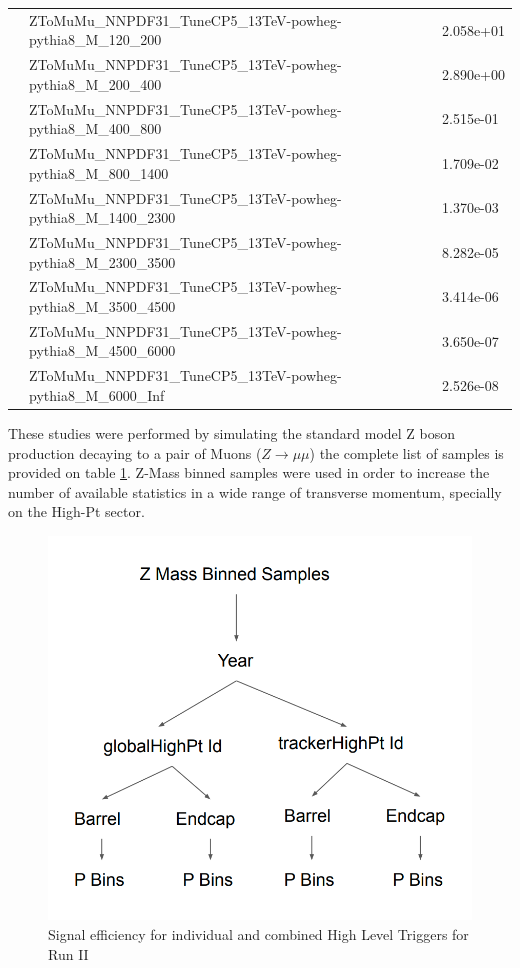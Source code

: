 \begin{table}
\begin{center}
\begin{tabular}{|l|l|l|}
&ZToMuMu\_NNPDF31\_TuneCP5\_13TeV-powheg-pythia8\_M\_120\_200 & 2.058e+01\\
&ZToMuMu\_NNPDF31\_TuneCP5\_13TeV-powheg-pythia8\_M\_200\_400 & 2.890e+00\\
&ZToMuMu\_NNPDF31\_TuneCP5\_13TeV-powheg-pythia8\_M\_400\_800 & 2.515e-01\\
&ZToMuMu\_NNPDF31\_TuneCP5\_13TeV-powheg-pythia8\_M\_800\_1400 & 1.709e-02\\
&ZToMuMu\_NNPDF31\_TuneCP5\_13TeV-powheg-pythia8\_M\_1400\_2300 & 1.370e-03\\
&ZToMuMu\_NNPDF31\_TuneCP5\_13TeV-powheg-pythia8\_M\_2300\_3500 & 8.282e-05\\
&ZToMuMu\_NNPDF31\_TuneCP5\_13TeV-powheg-pythia8\_M\_3500\_4500 & 3.414e-06\\
&ZToMuMu\_NNPDF31\_TuneCP5\_13TeV-powheg-pythia8\_M\_4500\_6000 & 3.650e-07\\
&ZToMuMu\_NNPDF31\_TuneCP5\_13TeV-powheg-pythia8\_M\_6000\_Inf & 2.526e-08\\
\hline
\end{tabular}
\label{tab:MomentumResolutionSamples}
\end{center}
\end{table}

These studies were performed by simulating the standard model Z boson production
decaying to a pair of Muons ($Z\rightarrow\mu\mu$) the complete list of samples is
provided on table \ref{tab:MomentumResolutionSamples}.
Z-Mass binned samples were used in order to increase the number of available
statistics in a wide range of transverse momentum, specially on the High-Pt sector.

\begin{figure}[tph]
  \centering
  \includegraphics[width=.5\textwidth]{fig/MomentumResolution/MomentumResolutionBins.png}
  \caption{Signal efficiency for individual and combined High Level Triggers for Run II}
  \label{fig:MomentumResolutionBins}
\end{figure}


